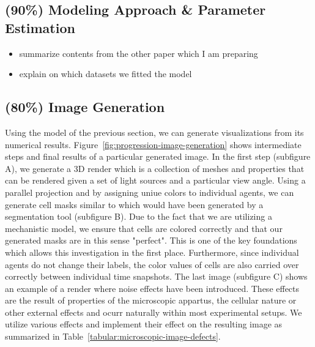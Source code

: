 \documentclass{article}
\begin{document}
\subsection{(90\%) Modeling Approach \& Parameter Estimation}

\begin{itemize}
    \item summarize contents from the other paper which I am preparing
    \item explain on which datasets we fitted the model
\end{itemize}

\subsection{(80\%) Image Generation}
Using the model of the previous section, we can generate visualizations from its numerical results.
Figure~\ref{fig:progression-image-generation} shows intermediate steps and final results of a
particular generated image.
In the first step (subfigure A), we generate a 3D render which is a collection of meshes and
properties that can be rendered given a set of light sources and a particular view angle.
Using a parallel projection and by assigning uniue colors to individual agents, we can generate cell
masks similar to which would have been generated by a segmentation tool (subfigure B).
Due to the fact that we are utilizing a mechanistic model, we ensure that cells are colored
correctly and that our generated masks are in this sense "perfect".
This is one of the key foundations which allows this investigation in the first place.
Furthermore, since individual agents do not change their labels, the color values of cells are also
carried over correctly between individual time snapshots.
The last image (subfigure C) shows an example of a render where noise effects have been introduced.
These effects are the result of properties of the microscopic appartus, the cellular nature or other
external effects and ocurr naturally within most experimental setups.
We utilize various effects and implement their effect on the resulting image as summarized in
Table~\ref{tabular:microscopic-image-defects}.
\end{document}
